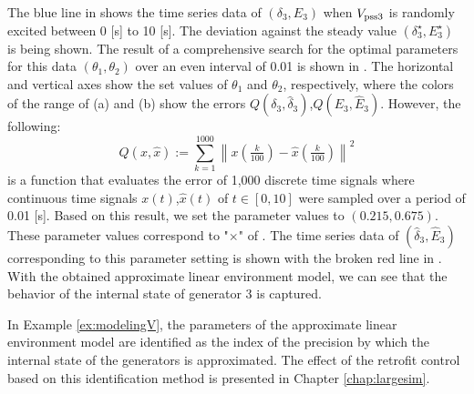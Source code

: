 \documentclass[graybox, envcountchap]{svmult}
\begin{document}
\begin{例}

The blue line in  shows the time series data of $(\delta_3,E_3)$ when $V_{{\rm pss}3}$ is randomly excited between 0 [s] to 10 [s].
The deviation against the steady value $(\delta_3^{\star},E_3^{\star})$ is being shown.
The result of a comprehensive search for the optimal parameters for this data $(\theta_1,\theta_2)$ over an even interval of 0.01 is shown in .
The horizontal and vertical axes show the set values of $\theta_1$ and $\theta_2$, respectively, where the colors of the range of (a) and (b) show the errors $Q(\delta_3,\hat{\delta}_3)$,$Q(E_3,\hat{E}_3)$.
However, the following:
\[
Q(x,\hat{x}):=
\sum_{k=1}^{1000}
\left\|
x\left(
\tfrac{k}{100}
\right)
-
\hat{x}\left(
\tfrac{k}{100}
\right)
\right\|^2
\]
is a function that evaluates the error of 1,000 discrete time signals where continuous time signals $x(t)$,$\hat{x}(t)$ of $t\in [0,10]$ were sampled over a period of 0.01 [s].
Based on this result, we set the parameter values to $(0.215,0.675)$.
These parameter values correspond to "$\times$" of .
The time series data of $(\hat{\delta}_3,\hat{E}_3)$ corresponding to this parameter setting is shown with the broken red line in .
With the obtained approximate linear environment model, we can see that the behavior of the internal state of generator 3 is captured.
\end{例}


In Example \ref{ex:modelingV}, the parameters of the approximate linear environment model are identified as the index of the precision by which the internal state of the generators is approximated.
The effect of the retrofit control based on this identification method is presented in Chapter \ref{chap:largesim}.

\newpage
%
%
\end{document}
